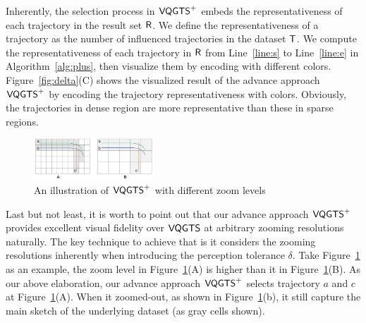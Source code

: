 Inherently, the selection process in $\mathsf{VQGTS}^{+}$ embeds the representativeness of each trajectory in the result set $\mathsf{R}$.
We define the representativeness of a trajectory as the number of influenced trajectories in the dataset $\mathsf{T}$.
We compute the representativeness of each trajectory in $\mathsf{R}$ from Line~\ref{line:s} to Line~\ref{line:e} in Algorithm~\ref{alg:plus}, then visualize them by encoding with different colors.
Figure~\ref{fig:delta}(C) shows the visualized result of the  advance approach $\mathsf{VQGTS}^{+}$ by encoding the trajectory representativeness with colors.
Obviously, the trajectories in dense region are more representative than these in sparse regions.

\begin{figure}[t]
	\centering
	\includegraphics[width=0.4\textwidth]{pictures/problemsolveing/one_to_many.pdf}
	\caption{An illustration of $\mathsf{VQGTS}^{+}$ with different zoom levels}
	\label{fig:zoom}
\end{figure}

Last but not least, it is worth to point out that our advance approach $\mathsf{VQGTS}^{+}$ provides excellent visual fidelity over $\mathsf{VQGTS}$ at arbitrary zooming resolutions naturally.
The key technique to achieve that is it considers the zooming resolutions inherently when introducing the perception tolerance $\delta$.
Take Figure~\ref{fig:zoom} as an example, %
the zoom level in Figure~\ref{fig:zoom}(A) is higher than it in Figure~\ref{fig:zoom}(B).
As our above elaboration, our advance approach $\mathsf{VQGTS}^{+}$ selects trajectory $a$ and $c$ at Figure~\ref{fig:zoom}(A).
When it zoomed-out, as shown in Figure~\ref{fig:zoom}(b), it still capture the main sketch of the underlying dataset (as gray cells shown).







